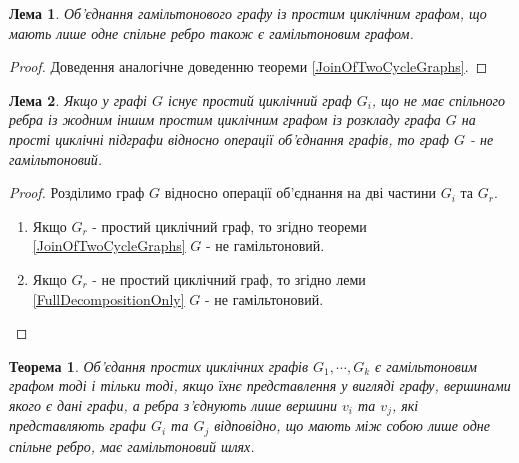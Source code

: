 \documentclass[a4paper,14pt,ukrainian]{extarticle}
\newtheorem{theorem}{Теорема}
\newtheorem{lemma}{Лема}
\begin{document}
    \begin{lemma}
    \label{JoinOfHamiltonianAndCycleGraphs}
        Об’єднання гамільтонового графу із простим циклічним графом, що мають лише одне спільне ребро також є гамільтоновим графом.
    \end{lemma}
    \begin{proof}
        Доведення аналогічне доведенню теореми \ref{JoinOfTwoCycleGraphs}.
    \end{proof}
    \begin{lemma}
        Якщо у графі $G$ існує простий циклічний граф $G_i$, що не має спільного ребра із жодним іншим простим циклічним графом із розкладу графа $G$ на прості циклічні підграфи відносно операції об’єднання графів, то граф $G$ - не гамільтоновий.
    \end{lemma}
    \begin{proof}
        Розділимо граф $G$ відносно операції об’єднання на дві частини $G_i$ та $G_r$.
        \begin{enumerate}
            \item Якщо $G_r$ - простий циклічний граф, то згідно теореми \ref{JoinOfTwoCycleGraphs} $G$ - не гамільтоновий.
            \item Якщо $G_r$ - не простий циклічний граф, то згідно леми \ref{FullDecompositionOnly} $G$ - не гамільтоновий.
        \end{enumerate}
    \end{proof}
    \begin{theorem}
        Об’єдання простих циклічних графів $G_1, \cdots , G_k$ є гамільтоновим графом тоді і тільки тоді, якщо їхнє представлення у вигляді графу, вершинами якого є дані графи, а ребра з’єднують лише вершини $v_i$ та $v_j$, які представляють графи $G_i$ та $G_j$ відповідно, що мають між собою лише одне спільне ребро, має гамільтоновий шлях.
    \end{theorem}
\end{document}
